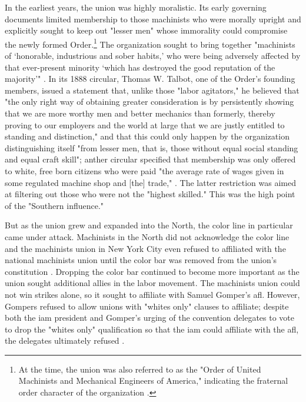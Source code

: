 \documentclass[12pt]{article}
\begin{document}
In the earliest years, the union was highly moralistic. Its early governing documents limited membership to those machinists who were morally upright and explicitly sought to keep out "lesser men" whose immorality could compromise the newly formed Order.\footnote{At the time, the union was also referred to as the "Order of United Machinists and Mechanical Engineers of America," indicating the fraternal order character of the organization \parencite[5]{perlmanMachinistsNewStudy1961}.} The organization sought to bring together "machinists of ‘honorable, industrious and sober habits,’ who were being adversely affected by that ever-present minority ‘which has destroyed the good reputation of the majority’" \parencite[5]{perlmanMachinistsNewStudy1961}. In its 1888 circular, Thomas W. Talbot, one of the Order's founding members, issued a statement that, unlike those "labor agitators," he believed that "the only right way of obtaining greater consideration is by persistently showing that we are more worthy men and better mechanics than formerly, thereby proving to our employers and the world at large that we are justly entitled to standing and distinction," and that this could only happen by the organization distinguishing itself "from lesser men, that is, those without equal social standing and equal craft skill"; anther circular specified that membership was only offered to white, free born citizens who were paid "the average rate of wages given in some regulated machine shop and [the] trade," \parencite[5--6]{perlmanMachinistsNewStudy1961}. The latter restriction was aimed at filtering out those who were not the "highest skilled." This was the high point of the "Southern influence."

But as the union grew and expanded into the North, the color line in particular came under attack. Machinists in the North did not acknowledge the color line and the machinists union in New York City even refused to affiliated with the national machinists union until the color bar was removed from the union's constitution \parencite[9--10]{perlmanMachinistsNewStudy1961}. Dropping the color bar continued to become more important as the union sought additional allies in the labor movement. The machinists union could not win strikes alone, so it sought to affiliate with Samuel Gomper's \acrshort{afl}. However, Gompers refused to allow unions with "whites only" clauses to affiliate; despite both the \acrshort{iam} president and Gomper's urging of the convention delegates to vote to drop the "whites only" qualification so that the \acrshort{iam} could affiliate with the \acrshort{afl}, the delegates ultimately refused \parencite[16]{perlmanMachinistsNewStudy1961}. 
\end{document}
